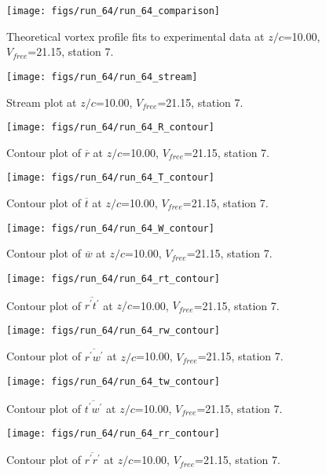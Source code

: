 \begin{figure}[H]
\centering
\texttt{[image: figs/run\_64/run\_64\_comparison]}
\caption{Theoretical vortex profile fits to experimental data at $z/c$=10.00, $V_{free}$=21.15, station 7.}
\end{figure}


\begin{figure}[H]
\centering
\texttt{[image: figs/run\_64/run\_64\_stream]}
\caption{Stream plot at $z/c$=10.00, $V_{free}$=21.15, station 7.}
\end{figure}


\begin{figure}[H]
\centering
\texttt{[image: figs/run\_64/run\_64\_R\_contour]}
\caption{Contour plot of $\overline{r}$ at $z/c$=10.00, $V_{free}$=21.15, station 7.}
\end{figure}


\begin{figure}[H]
\centering
\texttt{[image: figs/run\_64/run\_64\_T\_contour]}
\caption{Contour plot of $\overline{t}$ at $z/c$=10.00, $V_{free}$=21.15, station 7.}
\end{figure}


\begin{figure}[H]
\centering
\texttt{[image: figs/run\_64/run\_64\_W\_contour]}
\caption{Contour plot of $\overline{w}$ at $z/c$=10.00, $V_{free}$=21.15, station 7.}
\end{figure}


\begin{figure}[H]
\centering
\texttt{[image: figs/run\_64/run\_64\_rt\_contour]}
\caption{Contour plot of $\overline{r^\prime t^\prime}$ at $z/c$=10.00, $V_{free}$=21.15, station 7.}
\end{figure}


\begin{figure}[H]
\centering
\texttt{[image: figs/run\_64/run\_64\_rw\_contour]}
\caption{Contour plot of $\overline{r^\prime w^\prime}$ at $z/c$=10.00, $V_{free}$=21.15, station 7.}
\end{figure}


\begin{figure}[H]
\centering
\texttt{[image: figs/run\_64/run\_64\_tw\_contour]}
\caption{Contour plot of $\overline{t^\prime w^\prime}$ at $z/c$=10.00, $V_{free}$=21.15, station 7.}
\end{figure}


\begin{figure}[H]
\centering
\texttt{[image: figs/run\_64/run\_64\_rr\_contour]}
\caption{Contour plot of $\overline{r^\prime r^\prime}$ at $z/c$=10.00, $V_{free}$=21.15, station 7.}
\end{figure}


